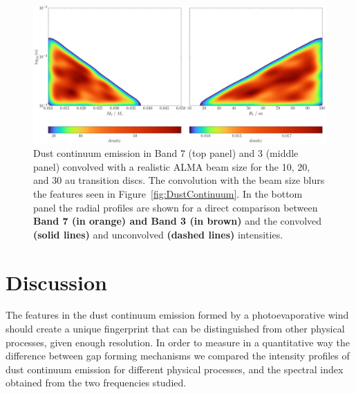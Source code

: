 \documentclass[fleqn,usenatbib]{mnras}
\begin{document}
        \begin{figure}
          \centering
          \includegraphics[width=\textwidth]{Fig5}
          \caption{Dust continuum emission in Band 7 (top panel) and 3 (middle panel) convolved with a realistic ALMA beam size for the 10, 20, and 30 au transition discs. The convolution with the beam size blurs the features seen in Figure~\ref{fig:DustContinuum}. In the bottom panel the radial profiles are shown for a direct comparison between \textbf{Band 7 (in orange) and Band 3 (in brown)} and the convolved \textbf{(solid lines)} and unconvolved \textbf{(dashed lines)} intensities.}
          \label{fig:comp_beam}
        \end{figure}

\section{Discussion} \label{sec:discussion}
    The features in the dust continuum emission formed by a photoevaporative wind should create a unique fingerprint that can be distinguished from other physical processes, given enough resolution.
    In order to measure in a quantitative way the difference between gap forming mechanisms we compared the intensity profiles of dust continuum emission for different physical processes, and the spectral index obtained from the two frequencies studied.
\end{document}
